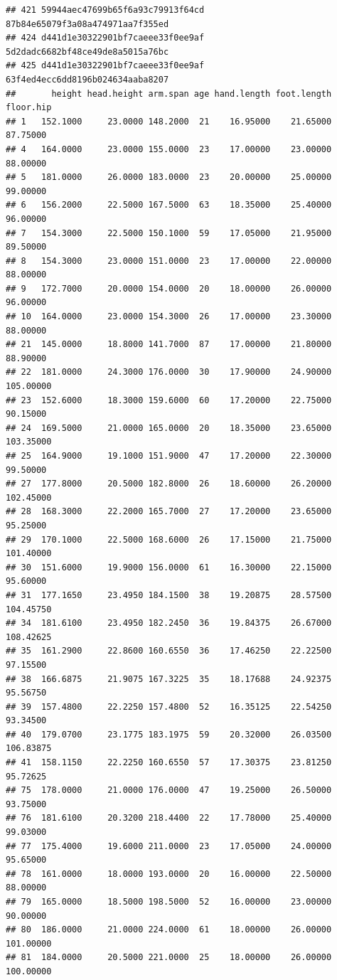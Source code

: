 \documentclass[]{article}
\begin{document}
\begin{verbatim}
## 421 59944aec47699b65f6a93c79913f64cd   87b84e65079f3a08a474971aa7f355ed
## 424 d441d1e30322901bf7caeee33f0ee9af   5d2dadc6682bf48ce49de8a5015a76bc
## 425 d441d1e30322901bf7caeee33f0ee9af   63f4ed4ecc6dd8196b024634aaba8207
##       height head.height arm.span age hand.length foot.length floor.hip
## 1   152.1000     23.0000 148.2000  21    16.95000    21.65000  87.75000
## 4   164.0000     23.0000 155.0000  23    17.00000    23.00000  88.00000
## 5   181.0000     26.0000 183.0000  23    20.00000    25.00000  99.00000
## 6   156.2000     22.5000 167.5000  63    18.35000    25.40000  96.00000
## 7   154.3000     22.5000 150.1000  59    17.05000    21.95000  89.50000
## 8   154.3000     23.0000 151.0000  23    17.00000    22.00000  88.00000
## 9   172.7000     20.0000 154.0000  20    18.00000    26.00000  96.00000
## 10  164.0000     23.0000 154.3000  26    17.00000    23.30000  88.00000
## 21  145.0000     18.8000 141.7000  87    17.00000    21.80000  88.90000
## 22  181.0000     24.3000 176.0000  30    17.90000    24.90000 105.00000
## 23  152.6000     18.3000 159.6000  60    17.20000    22.75000  90.15000
## 24  169.5000     21.0000 165.0000  20    18.35000    23.65000 103.35000
## 25  164.9000     19.1000 151.9000  47    17.20000    22.30000  99.50000
## 27  177.8000     20.5000 182.8000  26    18.60000    26.20000 102.45000
## 28  168.3000     22.2000 165.7000  27    17.20000    23.65000  95.25000
## 29  170.1000     22.5000 168.6000  26    17.15000    21.75000 101.40000
## 30  151.6000     19.9000 156.0000  61    16.30000    22.15000  95.60000
## 31  177.1650     23.4950 184.1500  38    19.20875    28.57500 104.45750
## 34  181.6100     23.4950 182.2450  36    19.84375    26.67000 108.42625
## 35  161.2900     22.8600 160.6550  36    17.46250    22.22500  97.15500
## 38  166.6875     21.9075 167.3225  35    18.17688    24.92375  95.56750
## 39  157.4800     22.2250 157.4800  52    16.35125    22.54250  93.34500
## 40  179.0700     23.1775 183.1975  59    20.32000    26.03500 106.83875
## 41  158.1150     22.2250 160.6550  57    17.30375    23.81250  95.72625
## 75  178.0000     21.0000 176.0000  47    19.25000    26.50000  93.75000
## 76  181.6100     20.3200 218.4400  22    17.78000    25.40000  99.03000
## 77  175.4000     19.6000 211.0000  23    17.05000    24.00000  95.65000
## 78  161.0000     18.0000 193.0000  20    16.00000    22.50000  88.00000
## 79  165.0000     18.5000 198.5000  52    16.00000    23.00000  90.00000
## 80  186.0000     21.0000 224.0000  61    18.00000    26.00000 101.00000
## 81  184.0000     20.5000 221.0000  25    18.00000    26.00000 100.00000

\end{verbatim}
\end{document}
